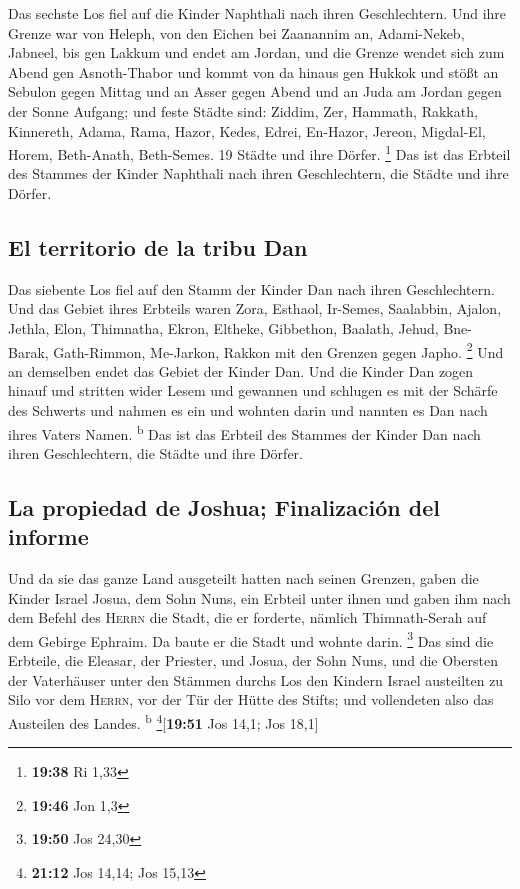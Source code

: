  Das sechste Los fiel auf die Kinder Naphthali nach ihren
Geschlechtern.  Und ihre Grenze war von Heleph, von den
Eichen bei Zaanannim an, Adami-Nekeb, Jabneel, bis gen Lakkum und endet
am Jordan,  und die Grenze wendet sich zum Abend gen
Asnoth-Thabor und kommt von da hinaus gen Hukkok und stößt an Sebulon
gegen Mittag und an Asser gegen Abend und an Juda am Jordan gegen der
Sonne Aufgang;  und feste Städte sind: Ziddim, Zer,
Hammath, Rakkath, Kinnereth,  Adama, Rama, Hazor,
 Kedes, Edrei, En-Hazor,  Jereon,
Migdal-El, Horem, Beth-Anath, Beth-Semes. 19 Städte und ihre Dörfer.
\footnote{\textbf{19:38} Ri 1,33}  Das ist das Erbteil
des Stammes der Kinder Naphthali nach ihren Geschlechtern, die Städte
und ihre Dörfer.

\hypertarget{el-territorio-de-la-tribu-dan}{%
\subsection{El territorio de la tribu
Dan}\label{el-territorio-de-la-tribu-dan}}

 Das siebente Los fiel auf den Stamm der Kinder Dan nach
ihren Geschlechtern.  Und das Gebiet ihres Erbteils waren
Zora, Esthaol, Ir-Semes,  Saalabbin, Ajalon, Jethla,
 Elon, Thimnatha, Ekron,  Eltheke,
Gibbethon, Baalath,  Jehud, Bne-Barak, Gath-Rimmon,
 Me-Jarkon, Rakkon mit den Grenzen gegen Japho.
\footnote{\textbf{19:46} Jon 1,3}  Und an demselben endet
das Gebiet der Kinder Dan. Und die Kinder Dan zogen hinauf und stritten
wider Lesem und gewannen und schlugen es mit der Schärfe des Schwerts
und nahmen es ein und wohnten darin und nannten es Dan nach ihres Vaters
Namen. \textsuperscript{b}  Das ist das Erbteil des
Stammes der Kinder Dan nach ihren Geschlechtern, die Städte und ihre
Dörfer.

\hypertarget{la-propiedad-de-joshua-finalizaciuxf3n-del-informe}{%
\subsection{La propiedad de Joshua; Finalización del
informe}\label{la-propiedad-de-joshua-finalizaciuxf3n-del-informe}}

 Und da sie das ganze Land ausgeteilt hatten nach seinen
Grenzen, gaben die Kinder Israel Josua, dem Sohn Nuns, ein Erbteil unter
ihnen  und gaben ihm nach dem Befehl des \textsc{Herrn}
die Stadt, die er forderte, nämlich Thimnath-Serah auf dem Gebirge
Ephraim. Da baute er die Stadt und wohnte darin. \footnote{\textbf{19:50}
  Jos 24,30}  Das sind die Erbteile, die Eleasar, der
Priester, und Josua, der Sohn Nuns, und die Obersten der Vaterhäuser
unter den Stämmen durchs Los den Kindern Israel austeilten zu Silo vor
dem \textsc{Herrn}, vor der Tür der Hütte des Stifts; und vollendeten
also das Austeilen des Landes. \textsuperscript{b}
\footnote{\textbf{21:12} Jos 14,14; Jos 15,13}{[}\textbf{19:51} Jos
14,1; Jos 18,1{]}

